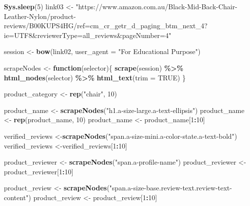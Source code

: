 \documentclass[
]{article}
\newenvironment{Shaded}{\begin{snugshade}}{\end{snugshade}}
\newcommand{\AttributeTok}[1]{\textcolor[rgb]{0.13,0.29,0.53}{#1}}
\newcommand{\ConstantTok}[1]{\textcolor[rgb]{0.56,0.35,0.01}{#1}}
\newcommand{\ControlFlowTok}[1]{\textcolor[rgb]{0.13,0.29,0.53}{\textbf{#1}}}
\newcommand{\DecValTok}[1]{\textcolor[rgb]{0.00,0.00,0.81}{#1}}
\newcommand{\FunctionTok}[1]{\textcolor[rgb]{0.13,0.29,0.53}{\textbf{#1}}}
\newcommand{\NormalTok}[1]{#1}
\newcommand{\OtherTok}[1]{\textcolor[rgb]{0.56,0.35,0.01}{#1}}
\newcommand{\SpecialCharTok}[1]{\textcolor[rgb]{0.81,0.36,0.00}{\textbf{#1}}}
\newcommand{\StringTok}[1]{\textcolor[rgb]{0.31,0.60,0.02}{#1}}
\begin{document}
\begin{Shaded}
\begin{Highlighting}[]
   \FunctionTok{Sys.sleep}\NormalTok{(}\DecValTok{5}\NormalTok{)}
\NormalTok{link03 }\OtherTok{\textless{}{-}} \StringTok{"https://www.amazon.com.au/Black{-}Mid{-}Back{-}Chair{-}Leather{-}Nylon/product{-}reviews/B00KUPS4HG/ref=cm\_cr\_getr\_d\_paging\_btm\_next\_4?ie=UTF8\&reviewerType=all\_reviews\&pageNumber=4"}


\NormalTok{  session }\OtherTok{\textless{}{-}} \FunctionTok{bow}\NormalTok{(link02,}
               \AttributeTok{user\_agent =} \StringTok{"For Educational Purpose"}\NormalTok{)}

\NormalTok{  scrapeNodes }\OtherTok{\textless{}{-}} \ControlFlowTok{function}\NormalTok{(selector)\{}
    \FunctionTok{scrape}\NormalTok{(session) }\SpecialCharTok{\%\textgreater{}\%}
      \FunctionTok{html\_nodes}\NormalTok{(selector) }\SpecialCharTok{\%\textgreater{}\%}
      \FunctionTok{html\_text}\NormalTok{(}\AttributeTok{trim =} \ConstantTok{TRUE}\NormalTok{)}
\NormalTok{  \}}

\NormalTok{  product\_category }\OtherTok{\textless{}{-}} \FunctionTok{rep}\NormalTok{(}\StringTok{"chair"}\NormalTok{, }\DecValTok{10}\NormalTok{)}

\NormalTok{  product\_name }\OtherTok{\textless{}{-}} \FunctionTok{scrapeNodes}\NormalTok{(}\StringTok{"h1.a{-}size{-}large.a{-}text{-}ellipsis"}\NormalTok{)}
\NormalTok{  product\_name }\OtherTok{\textless{}{-}} \FunctionTok{rep}\NormalTok{(product\_name, }\DecValTok{10}\NormalTok{)}
\NormalTok{  product\_name }\OtherTok{\textless{}{-}}\NormalTok{ product\_name[}\DecValTok{1}\SpecialCharTok{:}\DecValTok{10}\NormalTok{]}
  
\NormalTok{  verified\_reviews }\OtherTok{\textless{}{-}}\FunctionTok{scrapeNodes}\NormalTok{(}\StringTok{"span.a{-}size{-}mini.a{-}color{-}state.a{-}text{-}bold"}\NormalTok{)}
\NormalTok{  verified\_reviews }\OtherTok{\textless{}{-}}\NormalTok{verified\_reviews[}\DecValTok{1}\SpecialCharTok{:}\DecValTok{10}\NormalTok{]}
  
\NormalTok{  product\_reviewer }\OtherTok{\textless{}{-}} \FunctionTok{scrapeNodes}\NormalTok{(}\StringTok{"span.a{-}profile{-}name"}\NormalTok{)}
\NormalTok{  product\_reviewer }\OtherTok{\textless{}{-}}\NormalTok{ product\_reviewer[}\DecValTok{1}\SpecialCharTok{:}\DecValTok{10}\NormalTok{]}
  
\NormalTok{  product\_review }\OtherTok{\textless{}{-}} \FunctionTok{scrapeNodes}\NormalTok{(}\StringTok{"span.a{-}size{-}base.review{-}text.review{-}text{-}content"}\NormalTok{)}
\NormalTok{  product\_review }\OtherTok{\textless{}{-}}\NormalTok{ product\_review[}\DecValTok{1}\SpecialCharTok{:}\DecValTok{10}\NormalTok{]}
  

\end{Highlighting}
\end{Shaded}
\end{document}
